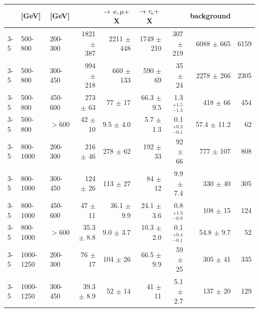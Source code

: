 \begin{table}[!hp]
{\begin{tabular}{lll|r|r|r|r|r|r}
      \NJets{} & \HT{} [GeV] &\MHT{} [GeV]
      & \multicolumn{1}{c|}{} 
      & \multicolumn{1}{c|}{$\to \,\text{e},\mu+$X}
      & \multicolumn{1}{c|}{$\to \tau_{\mbox{\tiny h}}+$X}  
      & \multicolumn{1}{c|}{}
      & \multicolumn{1}{c|}{background}  
      & \multicolumn{1}{c}{}  \\ 
      \hline
      3-5     & 500-800    & 200-300  & 1821   $\pm$  387         & 2211   $\pm$  448        &1749   $\pm$  210        & 307  $\pm$  219         & 6088   $\pm$  665      &  6159  \\
      3-5     & 500-800    & 300-450  &  994   $\pm$  218         &  660   $\pm$  133        & 590   $\pm$   69        & 35   $\pm$   24         & 2278   $\pm$  266      &  2305  \\
      3-5     & 500-800    & 450-600  &  273   $\pm$   63         &   77   $\pm$   17        &  66.3 $\pm$   9.5       &  1.3 $^{+1.5}_{-1.3}$       & 418    $\pm$   66      &   454  \\
      3-5     & 500-800    & $>600$   &   42   $\pm$   10         &   9.5 $\pm$    4.0       &   5.7 $\pm$   1.3       &  0.1 $^{+0.3}_{-0.1}$       & 57.4   $\pm$   11.2    &    62  \\ \hline
      3-5     & 800-1000   & 200-300  &  216   $\pm$   46         &  278   $\pm$   62        & 192   $\pm$   33        & 92   $\pm$   66         & 777    $\pm$  107      &   808  \\
      3-5     & 800-1000   & 300-450  &  124   $\pm$   26         &  113   $\pm$   27        &  84   $\pm$   12        &  9.9 $\pm$    7.4       & 330    $\pm$   40      &   305  \\
      3-5     & 800-1000   & 450-600  &   47   $\pm$   11         &   36.1 $\pm$    9.9      &  24.1 $\pm$    3.6      &  0.8 $^{+1.3}_{-0.8}$       & 108    $\pm$   15      &   124  \\
      3-5     & 800-1000   & $>600$   &   35.3 $\pm$    8.8       &    9.0 $\pm$    3.7      &  10.3 $\pm$    2.0      &  0.1 $^{+0.4}_{-0.1}$       & 54.8   $\pm$   9.7     &    52  \\ \hline
      3-5     & 1000-1250  & 200-300  &   76   $\pm$   17         &  104   $\pm$   26        &  66.5 $\pm$    9.9      & 59   $\pm$   25         & 305    $\pm$   41      &   335  \\
      3-5     & 1000-1250  & 300-450  &   39.3 $\pm$    8.9       &   52   $\pm$   14        &  41   $\pm$   11        &  5.1 $\pm$    2.7       & 137    $\pm$   20      &   129  \\

\end{tabular}}
\end{table}
